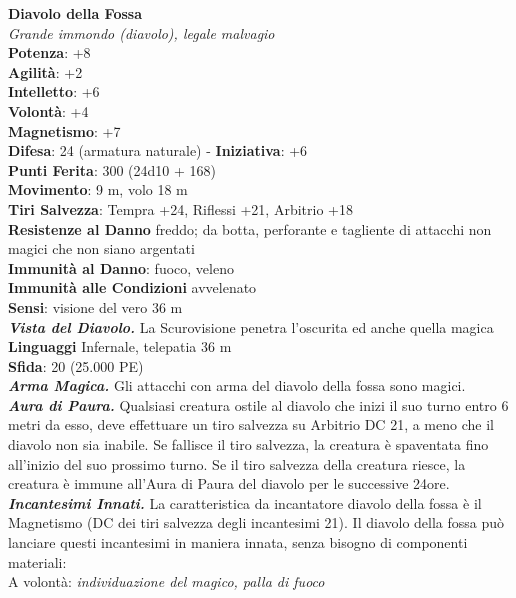 \begin{multicols}{2}
\medskip\textbf{Diavolo della Fossa}\\
\emph{Grande immondo (diavolo), legale malvagio}\\
\textbf{Potenza}: +8\\
\textbf{Agilità}: +2\\
\textbf{Intelletto}: +6\\
\textbf{Volontà}: +4\\
\textbf{Magnetismo}: +7\\
\textbf{Difesa}: 24 (armatura naturale) - \textbf{Iniziativa}: +6\\
\textbf{Punti Ferita}: 300 (24d10 + 168)\\
\textbf{Movimento}: 9 m, volo 18 m\\
\textbf{Tiri Salvezza}: Tempra +24, Riflessi +21, Arbitrio +18\\
\textbf{Resistenze al Danno} freddo; da botta, perforante e tagliente di attacchi non magici che non siano argentati\\
\textbf{Immunità al Danno}: fuoco, veleno\\
\textbf{Immunità alle Condizioni} avvelenato\\
\textbf{Sensi}: visione del vero 36 m\\
\emph{\textbf{Vista del Diavolo.}} La Scurovisione penetra l'oscurita ed anche quella magica\\
\textbf{Linguaggi} Infernale, telepatia 36 m\\ 
\textbf{Sfida}: 20 (25.000 PE)\smallskip\\
\emph{\textbf{Arma Magica.}} Gli attacchi con arma del diavolo della fossa sono magici.\\
\emph{\textbf{Aura di Paura.}} Qualsiasi creatura ostile al diavolo che inizi il suo turno entro 6 metri da esso, deve effettuare un tiro salvezza su Arbitrio DC 21, a meno che il diavolo non sia inabile. Se fallisce il tiro salvezza, la creatura è spaventata fino all'inizio del suo prossimo turno. Se il tiro salvezza della creatura riesce, la creatura è immune all'Aura di Paura del diavolo per le successive 24ore. \\
\emph{\textbf{Incantesimi Innati.}} La caratteristica da incantatore diavolo della fossa è il Magnetismo (DC dei tiri salvezza degli incantesimi 21). Il diavolo della fossa può lanciare questi incantesimi in maniera innata, senza bisogno di componenti materiali:\\
A volontà: \emph{individuazione del magico, palla di fuoco}\\

\end{multicols}
